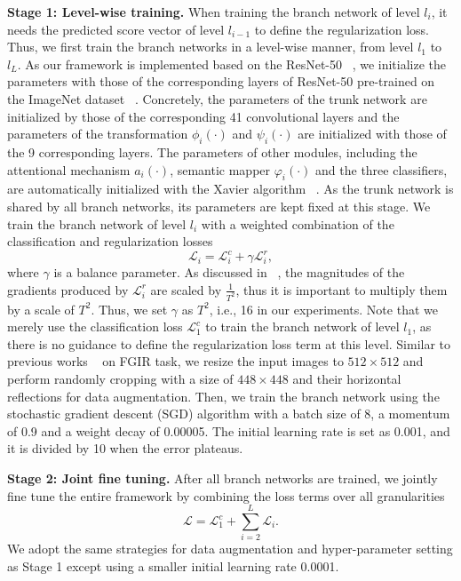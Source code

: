 \documentclass[sigconf]{acmart}
\begin{document}
\noindent\textbf{Stage 1: Level-wise training. }
When training the branch network of level $l_i$, it needs the predicted score vector of level $l_{i-1}$ to define the regularization loss. Thus, we first train the branch networks in a level-wise manner, from level $l_1$ to $l_L$. As our framework is implemented based on the ResNet-50 ~\cite{he2016deep}, we initialize the parameters with those of the corresponding layers of ResNet-50 pre-trained on the ImageNet dataset ~\cite{deng2009imagenet}. Concretely, the parameters of the trunk network are initialized by those of the corresponding 41 convolutional layers and the parameters of the transformation $\phi_i(\cdot)$ and $\psi_i(\cdot)$ are initialized with those of the 9 corresponding layers. The parameters of other modules, including the attentional mechanism $a_i(\cdot)$, semantic mapper $\varphi_i(\cdot)$ and the three classifiers, are automatically initialized with the Xavier algorithm ~\cite{glorot2010understanding}. As the trunk network is shared by all branch networks, its parameters are kept fixed at this stage. We train the branch network of level $l_i$ with a weighted combination of the classification and regularization losses 
\begin{equation}
    \mathcal{L}_i=\mathcal{L}_i^c + \gamma \mathcal{L}_i^r,
\end{equation}
where $\gamma$ is a balance parameter. As discussed in ~\cite{hinton2015distilling}, the magnitudes of the gradients produced by $\mathcal{L}_i^r$ are scaled by $\frac{1}{T^2}$, thus it is important to multiply them by a scale of $T^2$. Thus, we set $\gamma$ as $T^2$, i.e., 16 in our experiments. Note that we merely use the classification loss $\mathcal{L}_1^c$ to train the branch network of level $l_1$, as there is no guidance to define the regularization loss term at this level. Similar to previous works ~\cite{liu2016fully,lin2015bilinear} on FGIR task, we resize the input images to $512 \times 512$ and perform randomly cropping with a size of $448 \times 448$ and their horizontal reflections for data augmentation. Then, we train the branch network using the stochastic gradient descent (SGD) algorithm with a batch size of 8, a momentum of 0.9 and a weight decay of 0.00005. The initial learning rate is set as 0.001, and it is divided by 10 when the error plateaus.

\noindent\textbf{Stage 2: Joint fine tuning. }After all branch networks are trained, we jointly fine tune the entire framework by combining the loss terms over all granularities
\begin{equation}
    \mathcal{L}=\mathcal{L}_1^c+\sum_{i=2}^L{\mathcal{L}_i}.
\end{equation}
We adopt the same strategies for data augmentation and hyper-parameter setting as Stage 1 except using a smaller initial learning rate 0.0001.
\end{document}
